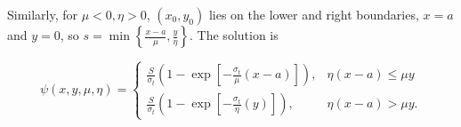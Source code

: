 \documentclass{midterm-template}
\begin{document}
Similarly, for $\mu<0, \eta > 0$, $(x_0, y_0)$ lies on the lower and right boundaries, $x=a$ and $y=0$, so $s = \min\left\{ \frac{x-a}{\mu}, \frac{y}{\eta} \right\}$. The solution is 

\begin{equation}
    \psi(x, y, \mu, \eta) = \begin{cases}
        \frac{S}{\sigma_t} \left(1 - \exp\left[-\frac{\sigma_t}{\mu} (x-a)  \right] \right), & \eta (x-a) \leq \mu y\\
        \frac{S}{\sigma_t} \left(1 - \exp\left[-\frac{\sigma_t}{\eta} (y)  \right] \right), & \eta (x-a) > \mu y.
    \end{cases}
\end{equation}
\end{document}
